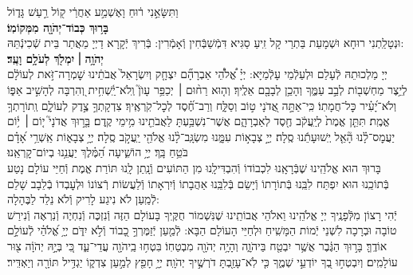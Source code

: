 \documentclass[twoside, openany, parskip=half, 11pt]{book}
\begin{document}
{	וַתִּשָּׂאֵ֣נִי ר֔וּחַ וָאֶשְׁמַ֣ע אַחֲרַ֔י ק֖וֹל רַ֣עַשׁ גָּד֑וֹל\\
	\textbf{בָּר֥וּךְ כְּבוֹד־יְהֹוָ֖ה מִמְּקוֹמֽוֹ׃} \\
	וּנְטָלַֽתְנִי רוּחָא וּשְׁמָעֵת בַּתְרַי קָל זִֽיעַ סַגִּיא דִּמְֿשַׁבְּֿחִין וְֿאָמְֿרִין: בְּֿרִיךְ יְֿקָרָא דַיְיָ מֵאֲתַר בֵּית שְֿׁכִינְֿתֵּהּ:\\
	\textbf{יְהֹוָ֥ה ׀ יִמְלֹ֖ךְ לְעֹלָ֥ם וָעֶֽד׃} \\
	יְיָ מַלְכוּתֵהּ לְֿעָלַם וּלְעַלְֿמֵי עָלְֿמַיָּא: יְיָ֗
	אֱ֠לֹהֵ֠י אַבְרָהָ֞ם יִצְחָ֤ק וְיִשְׂרָאֵל֙ אֲבֹתֵ֔ינוּ שׇׁמְרָה־זֹּ֣את לְעוֹלָ֔ם לְיֵ֥צֶר מַחְשְׁב֖וֹת לְבַ֣ב עַמֶּ֑ךָ וְהָכֵ֥ן לְבָבָ֖ם אֵלֶֽיךָ׃ וְה֤וּא
	רַח֨וּם ׀ יְכַפֵּ֥ר עָוֺן֮ וְֽלֹא־יַֽ֫שְׁחִ֥ית וְ֭הִרְבָּה לְהָשִׁ֣יב אַפּ֑וֹ וְלֹא־יָ֝עִ֗יר כׇּל־חֲמָתֽוֹ׃  כִּֽי־אַתָּ֣ה
	אֲ֭דֹנָי ט֣וֹב וְסַלָּ֑ח וְרַב־חֶ֗֝סֶד לְכׇל־קֹֽרְאֶֽיךָ׃  צִדְקָתְךָ֣
	צֶ֣דֶק לְעוֹלָ֑ם וְֽתוֹרָתְךָ֥ אֱמֶֽת׃  תִּתֵּ֤ן
	אֱמֶת֙ לְיַֽעֲקֹ֔ב חֶ֖סֶד לְאַבְרָהָ֑ם אֲשֶׁר־נִשְׁבַּ֥עְתָּ לַאֲבֹתֵ֖ינוּ מִ֥ימֵי קֶֽדֶם׃  בָּ֤ר֣וּךְ
	אֲדֹנָי֮ י֤וֹם ׀ י֥֫וֹם יַעֲמׇס־לָ֗נוּ הָ֘אֵ֤ל יְֽשׁוּעָתֵ֬נוּ סֶֽלָה׃  יְיָ֣
	צְבָא֣וֹת עִמָּ֑נוּ מִשְׂגָּֽב־לָ֨נוּ אֱלֹהֵ֖י יַֽעֲקֹ֣ב סֶֽלָה׃ יְיָ֥
	צְבָא֑וֹת אַֽשְׁרֵ֥י אָ֝דָ֗ם בֹּטֵ֥חַ בָּֽךְ׃  יְיָ֥
	הוֹשִׁ֑יעָה הַ֝מֶּ֗לֶךְ יַעֲנֵ֥נוּ בְיוֹם־קׇרְאֵֽנוּ׃  \\
	בָּרוּךְ הוּא אֱלֹהֵֽינוּ שֶׁבְּֿרָאָֽנוּ לִכְבוֹדוֹ וְֿהִבְדִּילָֽנוּ מִן הַתּוֹעִים וְֿנָֽתַן לָֽנוּ תּוֹרַת אֱמֶת וְֿחַיֵּי עוֹלָם נָטַע בְּֿתוֹכֵֽנוּ הוּא יִפְתַּח לִבֵּֽנוּ בְּֿתוֹרָתוֹ וְֿיָשֵׂם בְּֿלִבֵּֽנוּ אַהֲבָתוֹ וְֿיִרְאָתוֹ וְֿלַעֲשׂוֹת רְֿצוֹנוֹ וּלְעׇבְדוֹ בְֿלֵבָב שָׁלֵם לְֿמַֽעַן לֹא נִיגַע לָרִיק וְֿלֹא נֵלֵד לַבֶּהָלָה:\\
	יְֿהִי רָצוֹן מִלְּֿפָנֶֽיךָ יְיָ אֱלֹהֵֽינוּ וֵאלֹהֵי אֲבוֹתֵֽינוּ שֶׁנִּשְׁמוֹר חֻקֶּֽיךָ בָּעוֹלָם הַזֶּה וְֿנִזְכֶּה וְֿנִחְיֶה וְֿנִרְאֶה וְֿנִירַשׁ טוֹבָה וּבְרָכָה לִשְׁנֵי יְֿמוֹת הַמָּשִֽׁיחַ וּלְחַיֵּי הָעוֹלָם הַבָּא: לְֿמַ֤עַן יְֿזַמֶּרְךָ֣ כָ֭בוֹד וְֿלֹ֣א יִדֹּ֑ם יְיָ֥ אֱ֝לֹהַ֗י לְֿעוֹלָ֣ם אוֹדֶֽךָּ׃ בָּר֣וּךְ הַגֶּ֔בֶר אֲשֶׁ֥ר יִבְטַ֖ח בַּיהֹוָ֑ה וְהָיָ֥ה יְהֹוָ֖ה מִבְטַחֽוֹ׃ בִּטְח֥וּ
	בַֽיהֹוָ֖ה עֲדֵי־עַ֑ד כִּ֚י בְּיָ֣הּ יְהֹוָ֔ה צ֖וּר עוֹלָמִֽים׃ וְיִבְטְח֣וּ
	בְ֭ךָ יוֹדְעֵ֣י שְׁמֶ֑ךָ כִּ֤י לֹֽא־עָזַ֖בְתָּ דֹרְשֶׁ֣יךָ יְהֹוָֽה׃ יְיָ֥
	חָפֵ֖ץ לְמַ֣עַן צִדְק֑וֹ יַגְדִּ֥יל תּוֹרָ֖ה וְיַאְדִּֽיר׃
}
 
\end{document}
